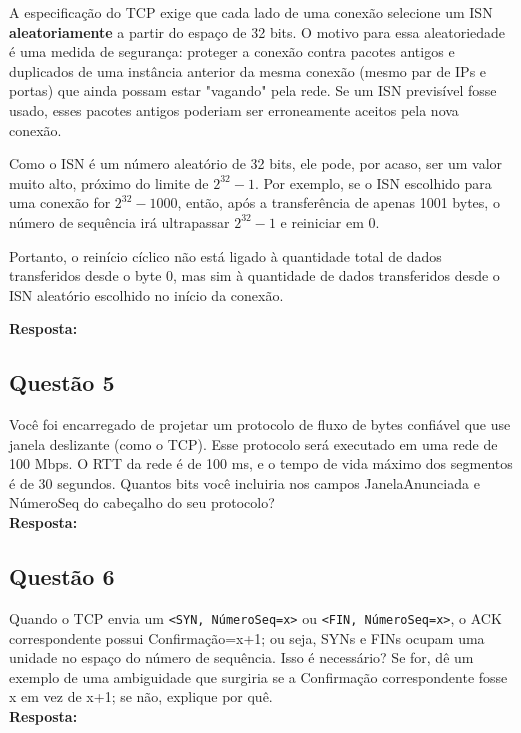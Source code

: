 A especificação do TCP exige que cada lado de uma conexão selecione um ISN \textbf{aleatoriamente} a partir do espaço de 32 bits.  O motivo para essa aleatoriedade é uma medida de segurança: proteger a conexão contra pacotes antigos e duplicados de uma instância anterior da mesma conexão (mesmo par de IPs e portas) que ainda possam estar "vagando" pela rede.  Se um ISN previsível fosse usado, esses pacotes antigos poderiam ser erroneamente aceitos pela nova conexão.

Como o ISN é um número aleatório de 32 bits, ele pode, por acaso, ser um valor muito alto, próximo do limite de $2^{32}-1$. Por exemplo, se o ISN escolhido para uma conexão for $2^{32}-1000$, então, após a transferência de apenas 1001 bytes, o número de sequência irá ultrapassar $2^{32}-1$ e reiniciar em 0.

Portanto, o reinício cíclico não está ligado à quantidade total de dados transferidos desde o byte 0, mas sim à quantidade de dados transferidos desde o ISN aleatório escolhido no início da conexão.

\noindent
\textbf{Resposta:}

\subsection{Questão 5}
Você foi encarregado de projetar um protocolo de fluxo de bytes confiável que use janela
deslizante (como o TCP). Esse protocolo será executado em uma rede de 100 Mbps. O RTT da
rede é de 100 ms, e o tempo de vida máximo dos segmentos é de 30 segundos.
Quantos bits você incluiria nos campos JanelaAnunciada e NúmeroSeq do cabeçalho do seu
protocolo?\\

\noindent
\textbf{Resposta:}

\subsection{Questão 6}
Quando o TCP envia um \texttt{<SYN, NúmeroSeq=x>} ou \texttt{<FIN, NúmeroSeq=x>}, o ACK correspondente
possui Confirmação=x+1; ou seja, SYNs e FINs ocupam uma unidade no espaço do número
de sequência. Isso é necessário? Se for, dê um exemplo de uma ambiguidade que surgiria se a
Confirmação correspondente fosse x em vez de x+1; se não, explique por quê.\\

\noindent
\textbf{Resposta:}